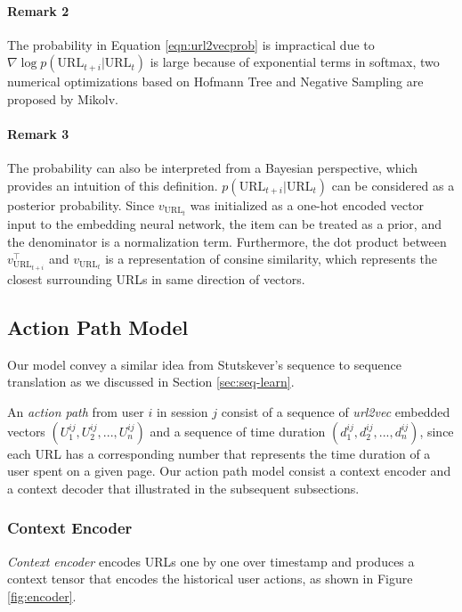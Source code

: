 \paragraph{Remark 2} The probability in Equation \ref{eqn:url2vecprob} is impractical due to
$\nabla \log{p(\text{URL}_{t+i} | \text{URL}_t)}$ is large because of exponential terms in softmax,
two numerical optimizations \cite{mikolv2013embedding} based on Hofmann Tree and Negative Sampling
are proposed by Mikolv.

\paragraph{Remark 3} The probability can also be interpreted from a Bayesian perspective,
which provides an intuition of this definition. $p(\text{URL}_{t+i} | \text{URL}_t)$
can be considered as a posterior probability. Since $v_{\text{URL}_t}$ was initialized
as a one-hot encoded vector input to the embedding neural network, the item can be treated
as a prior, and the denominator is a normalization term.
Furthermore, the dot product between $v_{\text{URL}_{t+i}} ^\top$
and $v_{\text{URL}_t}$ is a representation of consine similarity, which represents
the closest surrounding URLs in same direction of vectors.

\subsection{Action Path Model}

Our model convey a similar idea from Stutskever's sequence 
to sequence translation as we discussed in Section \ref{sec:seq-learn}.

An \emph{action path} from user $i$ in session $j$ consist of 
a sequence of \emph{url2vec} embedded vectors $(U^{ij}_1, U^{ij}_2, ..., U^{ij}_n)$ 
and a sequence of time duration $(d^{ij}_1, d^{ij}_2, ..., d^{ij}_n)$, since each URL 
has a corresponding number that represents the time duration of a user spent on a given page.
Our action path model consist a context encoder and a context decoder that illustrated in the subsequent
subsections.

\subsubsection{Context Encoder}

\emph{Context encoder} encodes URLs one by one over timestamp and produces a context tensor 
that encodes the historical user actions, as shown in Figure \ref{fig:encoder}. 

